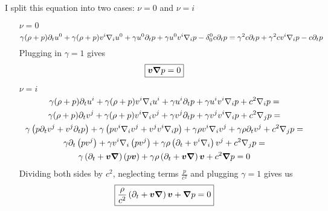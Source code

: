 %
I split this equation into two cases: $\nu = 0$ and $\nu = i$
\begin{itemize}
    \item[$\nu=0$]
          \begin{equation}
              \gamma (\rho + p) \partial_t u^0 +
              \gamma (\rho + p) v^i \nabla_i u^0 +
              \gamma u^0 \partial_t p +
              \gamma u^0 v^i \nabla_i p -
              \delta^0_0 c \partial_t p = \\
              \gamma^2 c \partial_t p +
              \gamma^2 c v^i \nabla_i p -
              c \partial_t p
          \end{equation}
          Plugging in $\gamma = 1$ gives
          \begin{equation}
              \boxed{\boldsymbol{v}\boldsymbol{\nabla}p = 0}
          \end{equation}
    \item[$\nu=i$]
          \begin{multline}
              \gamma (\rho + p) \partial_t u^i +
              \gamma (\rho + p) v^i \nabla_i u^i +
              \gamma u^i \partial_t p +
              \gamma u^i v^i \nabla_i p +
              c^2 \nabla_i p    = \\
              \gamma (\rho + p) \partial_t v^j +
              \gamma (\rho + p) v^i \nabla_i v^j +
              \gamma v^j \partial_t p +
              \gamma v^j v^i \nabla_i p +
              c^2 \nabla_j p    = \\
              \gamma \left(p \partial_t v^j + v^j \partial_t p\right) +
              \gamma \left(p v^i \nabla_i v^j + v^j v^i \nabla_i p\right) +
              \gamma \rho v^i \nabla_i v^j +
              \gamma \rho \partial_t v^j +
              c^2 \nabla_j p    = \\
              \gamma \partial_t\left(p v^j\right) +
              \gamma v^i \nabla_i \left(p  v^j\right) +
              \gamma \rho \left(\partial_t + v^i \nabla_i\right)v^j +
              c^2 \nabla_j p    = \\
              \gamma \left(\partial_t +  \boldsymbol{v} \boldsymbol{\nabla}\right) \left(p \boldsymbol{v}\right) +
              \gamma \rho \left(\partial_t + \boldsymbol{v} \boldsymbol{\nabla}\right)\boldsymbol{v} +
              c^2 \boldsymbol{\nabla} p    = 0
          \end{multline}
          Dividing both sides by $c^2$, neglecting terms $\frac{p}{c^2}$ and
          plugging $\gamma = 1$ gives us
          \begin{equation}
              \boxed{\frac{\rho}{c^2} \left(\partial_t + \boldsymbol{v} \boldsymbol{\nabla}\right)\boldsymbol{v} +
                  \boldsymbol{\nabla} p    = 0}
          \end{equation}
\end{itemize}
